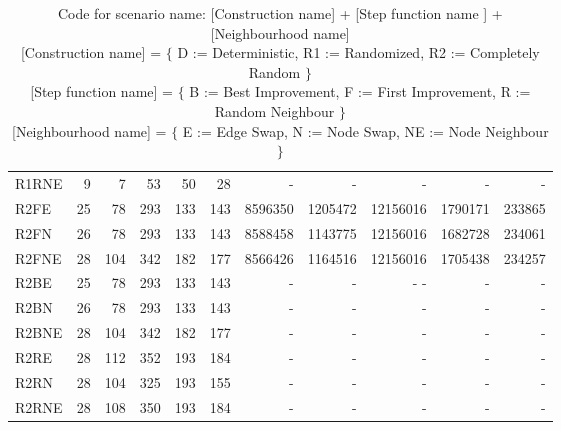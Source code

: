 \documentclass [11pt]{article}
\begin{document}
\begin{sidewaystable}
\begin{tabu} {| l |r | r |r |r |r |r |r |r |r |r |}
  R1RNE    &9   &7    &53    &50  & 28   &  -   &   -    &   -    &    -   &   -    \\ 
  R2FE    & 25  &  78   & 293   & 133  &  143  &  8596350  &  1205472   & 12156016    &  1790171  & 233865   \\ 
  R2FN    & 26  &  78   & 293   & 133  &  143  &  8588458  &  1143775   & 12156016    &  1682728  & 234061   \\ 
  R2FNE    &28   &104    &342    &182   & 177   & 8566426   & 1164516    & 12156016    & 1705438   &234257    \\ 
  R2BE    & 25  &  78   & 293   & 133  &  143  &  -   &   -    &   -  -    &    -   &   -    \\ 
  R2BN    & 26  &  78   & 293   & 133  &  143  &  -   &   -    &   -    &    -   &   -    \\ 
  R2BNE    &28   &104    &342    &182   & 177   &  -   &   -    &   -    &    -   &   -    \\ 
  R2RE    & 28  & 112   & 352   & 193  &  184  &  -   &   -    &   -    &    -   &   -    \\ 
  R2RN    & 28  & 104   & 325   & 193  &  155  &  -   &   -    &   -    &    -   &   -    \\ 
  R2RNE    &28   &108    &350    &193   & 184   &  -   &   -    &   -    &    -   &   -    \\
\end{tabu}
\caption{ Code for scenario name: [Construction name] + [Step function name ]  + [Neighbourhood name] \\ 
          {[Construction name]} = $\{$  D := Deterministic, R1 := Randomized, R2 := Completely Random $\}$  \\
          {[Step function name]} = $\{$  B := Best Improvement, F := First Improvement, R := Random Neighbour $\}$ \\
          {[Neighbourhood name]} = $\{$  E := Edge Swap, N := Node Swap, NE := Node Neighbour $\}$ } 
\end{sidewaystable}
\end{document}
